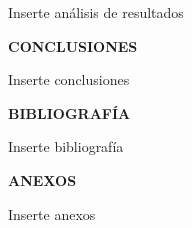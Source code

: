 \documentclass[12pt]{article}
\begin{document}
	Inserte análisis de resultados
	
	\newpage
	
	\begin{center}
		\textbf{\large CONCLUSIONES}\\
	\end{center}
	
	Inserte conclusiones
	
	\newpage
	
	\begin{center}
		\textbf{\large BIBLIOGRAFÍA}\\
	\end{center}
	
	Inserte bibliografía
	
	\newpage
	
	\begin{center}
		\textbf{\large ANEXOS}\\
	\end{center}
	
	Inserte anexos
	
\end{document}

